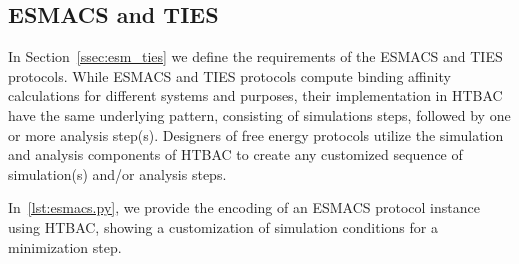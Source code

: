 \subsection{ESMACS and TIES} 


In Section~\ref{ssec:esm_ties} we define the requirements of the ESMACS and 
TIES protocols. While ESMACS and TIES protocols compute binding affinity 
calculations for different systems and purposes, their implementation in HTBAC 
have the same underlying pattern, consisting of simulations steps, followed by 
one or more analysis step(s). 
Designers of free energy protocols utilize the simulation and analysis 
components of HTBAC to create any customized sequence of simulation(s) and/or
analysis steps. 


In~\ref{lst:esmacs.py}, we provide the 
encoding of an ESMACS protocol instance using HTBAC, showing a customization of 
simulation conditions for a minimization step. 




